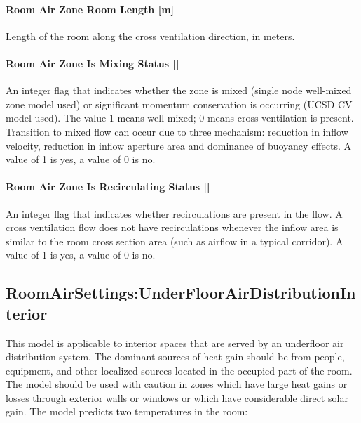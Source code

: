 \paragraph{Room Air Zone Room Length {[}m{]}}\label{room-air-zone-room-length-m}

Length of the room along the cross ventilation direction, in meters.

\paragraph{\texorpdfstring{Room Air Zone Is Mixing Status {[]}}{Room Air Zone Is Mixing Status }}\label{room-air-zone-is-mixing-status}

An integer flag that indicates whether the zone is mixed (single node well-mixed zone model used) or significant momentum conservation is occurring (UCSD CV model used). The value 1 means well-mixed; 0 means cross ventilation is present. Transition to mixed flow can occur due to three mechanism: reduction in inflow velocity, reduction in inflow aperture area and dominance of buoyancy effects. A value of 1 is yes, a value of 0 is no.

\paragraph{\texorpdfstring{Room Air Zone Is Recirculating Status {[]}}{Room Air Zone Is Recirculating Status }}\label{room-air-zone-is-recirculating-status}

An integer flag that indicates whether recirculations are present in the flow. A cross ventilation flow does not have recirculations whenever the inflow area is similar to the room cross section area (such as airflow in a typical corridor). A value of 1 is yes, a value of 0 is no.

\subsection{RoomAirSettings:UnderFloorAirDistributionInterior}\label{roomairsettingsunderfloorairdistributioninterior}

This model is applicable to interior spaces that are served by an underfloor air distribution system. The dominant sources of heat gain should be from people, equipment, and other localized sources located in the occupied part of the room. The model should be used with caution in zones which have large heat gains or losses through exterior walls or windows or which have considerable direct solar gain. The model predicts two temperatures in the room:

